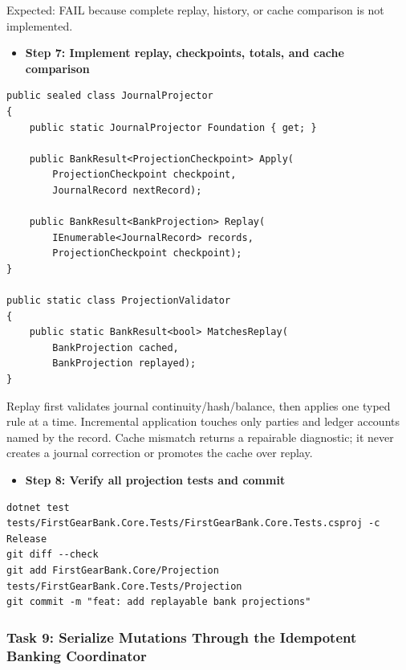 \documentclass[
  10pt,
  letterpaper,
]{article}
\providecommand{\tightlist}{%
  \setlength{\itemsep}{0pt}\setlength{\parskip}{0pt}}
\begin{document}
Expected: FAIL because complete replay, history, or cache comparison is
not implemented.

\begin{itemize}
\tightlist
\item[$\square$]
  \textbf{Step 7: Implement replay, checkpoints, totals, and cache
  comparison}
\end{itemize}

\begin{lstlisting}
public sealed class JournalProjector
{
    public static JournalProjector Foundation { get; }

    public BankResult<ProjectionCheckpoint> Apply(
        ProjectionCheckpoint checkpoint,
        JournalRecord nextRecord);

    public BankResult<BankProjection> Replay(
        IEnumerable<JournalRecord> records,
        ProjectionCheckpoint checkpoint);
}

public static class ProjectionValidator
{
    public static BankResult<bool> MatchesReplay(
        BankProjection cached,
        BankProjection replayed);
}
\end{lstlisting}

Replay first validates journal
continuity/\allowbreak{}hash/\allowbreak{}balance, then applies one
typed rule at a time. Incremental application touches only parties and
ledger accounts named by the record. Cache mismatch returns a repairable
diagnostic; it never creates a journal correction or promotes the cache
over replay.

\begin{itemize}
\tightlist
\item[$\square$]
  \textbf{Step 8: Verify all projection tests and commit}
\end{itemize}

\begin{lstlisting}
dotnet test tests/FirstGearBank.Core.Tests/FirstGearBank.Core.Tests.csproj -c Release
git diff --check
git add FirstGearBank.Core/Projection tests/FirstGearBank.Core.Tests/Projection
git commit -m "feat: add replayable bank projections"
\end{lstlisting}

\subsubsection{Task 9: Serialize Mutations Through the Idempotent
Banking
Coordinator}\label{task-9-serialize-mutations-through-the-idempotent-banking-coordinator}
\end{document}
